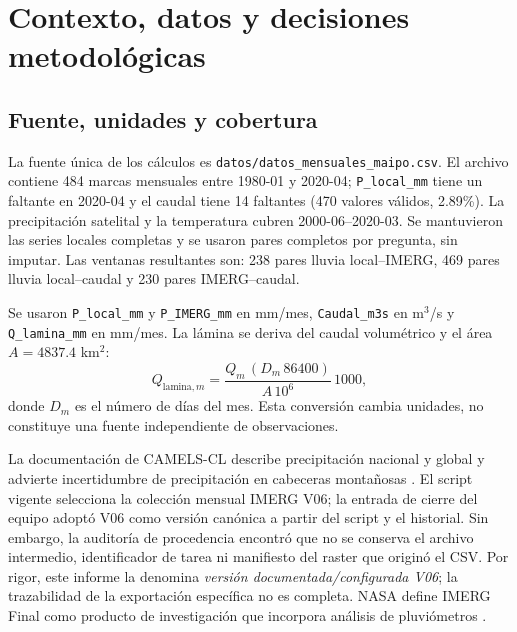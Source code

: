 \documentclass[12pt,letterpaper]{article}
\begin{document}
\section{Contexto, datos y decisiones metodológicas}

\subsection{Fuente, unidades y cobertura}
La fuente única de los cálculos es \texttt{datos/datos\_mensuales\_maipo.csv}. El archivo contiene 484 marcas mensuales entre 1980-01 y 2020-04; \texttt{P\_local\_mm} tiene un faltante en 2020-04 y el caudal tiene 14 faltantes (470 valores válidos, 2.89\%). La precipitación satelital y la temperatura cubren 2000-06--2020-03. Se mantuvieron las series locales completas y se usaron pares completos por pregunta, sin imputar. Las ventanas resultantes son: 238 pares lluvia local--IMERG, 469 pares lluvia local--caudal y 230 pares IMERG--caudal.

Se usaron \texttt{P\_local\_mm} y \texttt{P\_IMERG\_mm} en mm/mes, \texttt{Caudal\_m3s} en m$^3$/s y \texttt{Q\_lamina\_mm} en mm/mes. La lámina se deriva del caudal volumétrico y el área $A=4837.4$ km$^2$:
\begin{equation}
Q_{\mathrm{lamina},m}=\frac{Q_m\,(D_m\,86400)}{A\,10^6}\,1000,
\label{eq:runoff-depth}
\end{equation}
donde $D_m$ es el número de días del mes. Esta conversión cambia unidades, no constituye una fuente independiente de observaciones.

La documentación de CAMELS-CL describe precipitación nacional y global y advierte incertidumbre de precipitación en cabeceras montañosas \parencite{AlvarezGarreton2018}. El script vigente selecciona la colección mensual IMERG V06; la entrada de cierre del equipo adoptó V06 como versión canónica a partir del script y el historial. Sin embargo, la auditoría de procedencia encontró que no se conserva el archivo intermedio, identificador de tarea ni manifiesto del raster que originó el CSV. Por rigor, este informe la denomina \textit{versión documentada/configurada V06}; la trazabilidad de la exportación específica no es completa. NASA define IMERG Final como producto de investigación que incorpora análisis de pluviómetros \parencite{IMERGV06,IMERGV07}.
\end{document}
